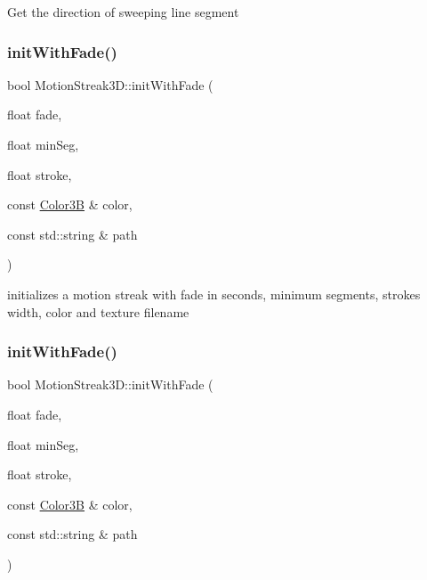 Get the direction of sweeping line segment \mbox{\label{classMotionStreak3D_aeb508d5a9a772ca2f87a195a92631501}} 
\subsubsection{\texorpdfstring{init\+With\+Fade()}{initWithFade()}\hspace{0.1cm}{\footnotesize\ttfamily [1/4]}}
{\footnotesize\ttfamily bool Motion\+Streak3\+D\+::init\+With\+Fade (\begin{DoxyParamCaption}\item[{float}]{fade,  }\item[{float}]{min\+Seg,  }\item[{float}]{stroke,  }\item[{const \hyperlink{structColor3B}{Color3B} \&}]{color,  }\item[{const std\+::string \&}]{path }\end{DoxyParamCaption})}

initializes a motion streak with fade in seconds, minimum segments, stroke\textquotesingle{}s width, color and texture filename \mbox{\label{classMotionStreak3D_aeb508d5a9a772ca2f87a195a92631501}} 
\subsubsection{\texorpdfstring{init\+With\+Fade()}{initWithFade()}\hspace{0.1cm}{\footnotesize\ttfamily [2/4]}}
{\footnotesize\ttfamily bool Motion\+Streak3\+D\+::init\+With\+Fade (\begin{DoxyParamCaption}\item[{float}]{fade,  }\item[{float}]{min\+Seg,  }\item[{float}]{stroke,  }\item[{const \hyperlink{structColor3B}{Color3B} \&}]{color,  }\item[{const std\+::string \&}]{path }\end{DoxyParamCaption})}

